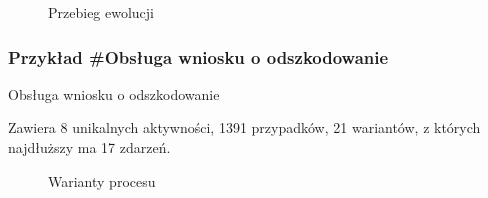 \begin{figure}[H]
	\caption{\label{fig:flow_chart}Przebieg ewolucji}
\end{figure}

\subsubsection{Przykład \#Obsługa wniosku o odszkodowanie}
Obsługa wniosku o odszkodowanie

Zawiera 8 unikalnych aktywności, 1391 przypadków, 21 wariantów, z których najdłuższy ma 17 zdarzeń. 
\begin{figure}[!ht]
	\caption{\label{fig:flow_chart}Warianty procesu}
\end{figure}

